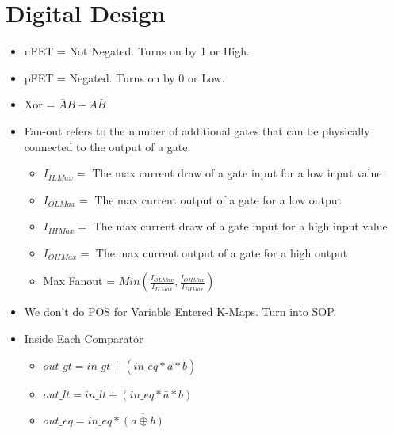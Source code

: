 \documentclass{article}
\newcommand*\xor{\mathbin{\oplus}}
\begin{document}
\section{Digital Design}
\begin{itemize}
    \item nFET = Not Negated. Turns on by 1 or High.
    \item pFET = Negated. Turns on by 0 or Low.
    \item Xor = $\bar{A}B + A\bar{B}$
    \item Fan-out refers to the number of additional gates that can be physically connected to the output of a gate.
    \begin{itemize}
        \item $I_{ILMax} =$ The max current draw of a gate input for a low input value
        \item $I_{OLMax} =$ The max current output of a gate for a low output
        \item $I_{IHMax} =$ The max current draw of a gate input for a high input value
        \item $I_{OHMax} =$ The max current output of a gate for a high output
        \item Max Fanout = $Min( \frac{I_{OLMax}}{I_{ILMax}}, \frac{I_{OHMax}}{I_{IHMax}} )$
    \end{itemize}
    \item We don't do POS for Variable Entered K-Maps. Turn into SOP.
    \item Inside Each Comparator
    \begin{itemize}
        \item $out\_gt = in\_gt + (in\_eq * a*\bar b)$
        \item $out\_lt = in\_lt + (in\_eq * \bar a* b)$
        \item $out\_eq = in\_eq * \overline{(a \xor b)}$
    \end{itemize}
\end{itemize}
\end{document}
